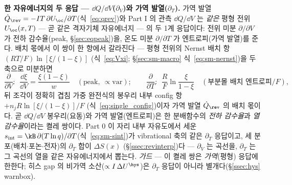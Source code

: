 
\begin{bgbox}
\textbf{한 자유에너지의 두 응답 --- $\dd Q/\dd V$($\partial_V$)와 가역 발열($\partial_T$).} 가역 발열
$\dot Q_\rev=-IT\,\partial U_\oc/\partial T$(식~\eqref{eq:qrev})와 Part I 의 관측 $\dd Q/\dd V$ 는 \emph{같은}
평형 전위 $U_\oc(x,T)$ --- 곧 같은 격자기체 자유에너지 --- 의 두 1계 응답이다: 전위 미분 $\partial/\partial V$
가 전하 감수율(peak, \S\ref{sec:eqpeak})을, 온도 미분 $\partial/\partial T$ 가 엔트로피(가역 발열)를 준다. 배치
몫에서 이 쌍이 한 항에서 갈라진다 --- 평형 전위의 Nernst 배치 항 $(RT/F)\ln[\xi/(1-\xi)]$
(식~\eqref{eq:Vxi}; \S\ref{sec:sm-macro} 식~\eqref{eq:sm-nernst})을 두 축으로 미분하면
\[
\frac{\partial}{\partial V}:\ \ \frac{\dd\xi}{\dd V}=\frac{\xi(1-\xi)}{w}\quad(\text{peak},\ \propto\mathrm{var});
\qquad
\frac{\partial}{\partial T}:\ \ \frac{R}{F}\ln\frac{\xi}{1-\xi}\quad(\text{부분몰 배치 엔트로피}/F),
\]
뒤 조각이 정확히 겹침 가중 완전식의 봉우리 내부 config 항 $+n_jR\ln[\xi/(1-\xi)]/F$
(식~\eqref{eq:single_config})이자 가역 발열 $\dot Q_\rev$ 의 배치 몫이다. 곧 $\dd Q/\dd V$ 봉우리(요동)와 가역
발열(엔트로피)은 한 분배함수의 \emph{전하 감수율}과 \emph{열 감수율}이라는 켤레 쌍이다. Part 0 이 자리 내부
자유도에서 세운 $s_\mathrm{int}=\kB\,\partial(T\ln q)/\partial T$(식~\eqref{eq:sm-sint})가 vibrational 축의
같은 $\partial_T$ 응답이고, 세 분포(배치$\cdot$포논$\cdot$전자)의 $\partial_T$ 합이 $\Delta S(x)$
(\S\ref{ssec:revinterp})다 --- $\partial_V$ 는 곡선을, $\partial_T$ 는 그 곡선의 열을 같은 자유에너지에서
뽑는다. \emph{가드} --- 이 켤레 쌍은 \emph{가역}(평형) 응답에 한한다; 히스 gap 의 비가역
소산($\propto I\,\Delta U^\hys$)은 $\partial_T$ 응답이 아니라 별개다(\S\ref{ssec:hys} warnbox).
\end{bgbox}


